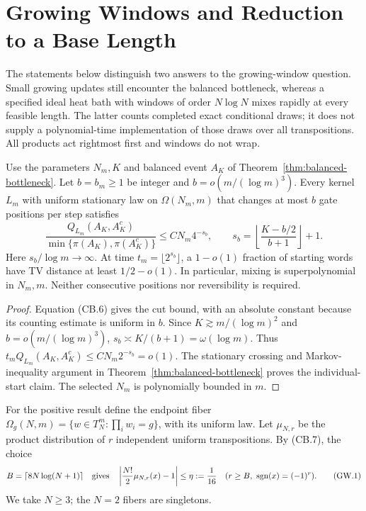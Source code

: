 \section{Growing Windows and Reduction to a Base Length}
\label{sec:growing-windows}

The statements below distinguish two answers to the growing-window question.
Small growing updates still encounter the balanced bottleneck, whereas a
specified ideal heat bath with windows of order $N\log N$ mixes rapidly at
every feasible length.  The latter counts completed exact conditional draws;
it does not supply a polynomial-time implementation of those draws over all
transpositions.  All products act rightmost first and windows do not wrap.

\begin{corollary}
\label{cor:growing-obstruction}
Use the parameters $N_m,K$ and balanced event $A_K$ of
Theorem~\ref{thm:balanced-bottleneck}.  Let $b=b_m\ge1$ be integer and
$b=o(m/(\log m)^3)$.  Every kernel $L_m$ with uniform stationary law on
$\Omega(N_m,m)$ that changes at most $b$ gate positions per step satisfies
\[
 \frac{Q_{L_m}(A_K,A_K^c)}{\min\{\pi(A_K),\pi(A_K^c)\}}
 \le C N_m4^{-s_b},\qquad
 s_b=\left\lfloor\frac{K-b/2}{b+1}\right\rfloor+1.
\]
Here $s_b/\log m\to\infty$.  At time $t_m=\lfloor2^{s_b}\rfloor$, a
$1-o(1)$ fraction of starting words have TV distance at least $1/2-o(1)$.
In particular, mixing is superpolynomial in $N_m,m$.  Neither consecutive
positions nor reversibility is required.
\end{corollary}
\begin{proof}
Equation (CB.6) gives the cut bound, with an absolute constant because its
counting estimate is uniform in $b$.  Since
$K\gtrsim m/(\log m)^2$ and $b=o(m/(\log m)^3)$,
$s_b\asymp K/(b+1)=\omega(\log m)$.  Thus
$t_m Q_{L_m}(A_K,A_K^c)\le C N_m2^{-s_b}=o(1)$.
The stationary crossing and Markov-inequality argument in
Theorem~\ref{thm:balanced-bottleneck} proves the individual-start claim.
The selected $N_m$ is polynomially bounded in $m$.
\end{proof}

For the positive result define the endpoint fiber
$\Omega_g(N,m)=\{w\in T_N^m:\prod_iw_i=g\}$, with its uniform law.
Let $\mu_{N,r}$ be the product distribution of $r$ independent uniform
transpositions.  By (CB.7), the choice
\[
 B=\lceil8N\log(N+1)\rceil
 \quad\hbox{gives}\quad
 \left|\frac{N!}{2}\mu_{N,r}(x)-1\right|\le\eta:=\frac1{16}
 \quad(r\ge B,\ \operatorname{sgn}(x)=(-1)^r).       \tag{GW.1}
\]
We take $N\ge3$; the $N=2$ fibers are singletons.

